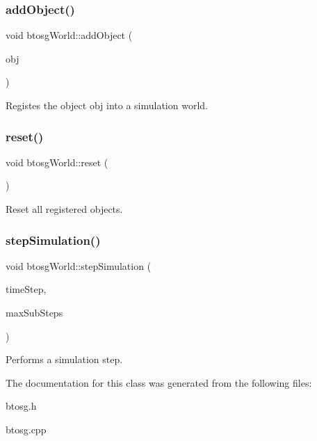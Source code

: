 \subsubsection{\texorpdfstring{add\+Object()}{addObject()}}
{\footnotesize\ttfamily void btosg\+World\+::add\+Object (\begin{DoxyParamCaption}\item[{class \hyperlink{classbtosgObject}{btosg\+Object} $\ast$}]{obj }\end{DoxyParamCaption})}

Registes the object obj into a simulation world. \mbox{\label{classbtosgWorld_a6af4d066410a86b44fff5563667ea9a9}} 
\subsubsection{\texorpdfstring{reset()}{reset()}}
{\footnotesize\ttfamily void btosg\+World\+::reset (\begin{DoxyParamCaption}{ }\end{DoxyParamCaption})}

Reset all registered objects. \mbox{\label{classbtosgWorld_afce096686d8f84afd8b8fa3f2dc161b8}} 
\subsubsection{\texorpdfstring{step\+Simulation()}{stepSimulation()}}
{\footnotesize\ttfamily void btosg\+World\+::step\+Simulation (\begin{DoxyParamCaption}\item[{bt\+Scalar}]{time\+Step,  }\item[{int}]{max\+Sub\+Steps }\end{DoxyParamCaption})}

Performs a simulation step. 

The documentation for this class was generated from the following files\+:\begin{DoxyCompactItemize}
\item 
btosg.\+h\item 
btosg.\+cpp\end{DoxyCompactItemize}
